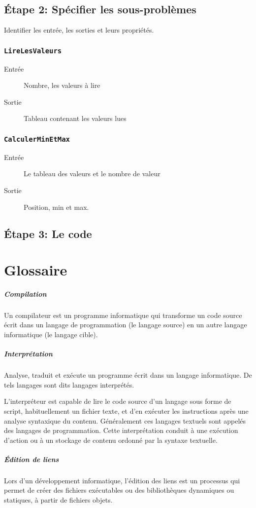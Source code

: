 \documentclass[12pt,a4paper,openany]{book}
\begin{document}
\section{\'Etape 2: Spécifier les sous-problèmes}
Identifier les entrée, les sorties et leurs propriétés.
\subsection{\texttt{LireLesValeurs}}
\begin{description}
	\item[Entrée] Nombre, les valeurs à lire
	\item[Sortie] Tableau contenant les valeurs lues
\end{description}
\subsection{\texttt{CalculerMinEtMax}}
\begin{description}
	\item[Entrée] Le tableau des valeurs et le nombre de valeur 
	\item[Sortie] Position, min et max. 
\end{description}
\newpage
\section{\'Etape 3: Le code}

	\appendix
	\chapter{Glossaire}
	\paragraph{Compilation} Un compilateur est un programme informatique qui transforme un code source écrit dans un langage de programmation (le langage source) en un autre langage informatique (le langage cible).
	\paragraph{Interprétation}
	Analyse, traduit et exécute un programme écrit dans un langage informatique. De tels langages sont dits langages interprétés.

	L'interpréteur est capable de lire le code source d'un langage sous forme de script, habituellement un fichier texte, et d'en exécuter les instructions après une analyse syntaxique du contenu. Généralement ces langages textuels sont appelés des langages de programmation. Cette interprétation conduit à une exécution d'action ou à un stockage de contenu ordonné par la syntaxe textuelle.
	\paragraph{Édition de liens} Lors d’un développement informatique, l'édition des liens est un processus qui permet de créer des fichiers exécutables ou des bibliothèques dynamiques ou statiques, à partir de fichiers objets.
	\lstlistoflistings{}
\end{document}
